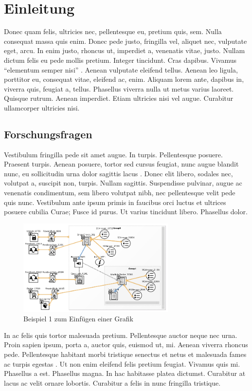 \chapter{Einleitung}
Donec quam felis, ultricies nec, pellentesque eu, pretium quis, sem. Nulla consequat massa quis enim. Donec pede justo, fringilla vel, aliquet nec, vulputate eget, arcu. In enim justo, rhoncus ut, imperdiet a, venenatis vitae, justo. Nullam dictum felis eu pede mollis pretium. Integer tincidunt. Cras dapibus. Vivamus "`elementum semper nisi"' \cite{Fischer.2010b}. Aenean vulputate eleifend tellus. Aenean leo ligula, porttitor eu, consequat vitae, eleifend ac, enim. Aliquam lorem ante, dapibus in, viverra quis, feugiat a, tellus. Phasellus viverra nulla ut metus varius laoreet. Quisque rutrum. Aenean imperdiet. Etiam ultricies nisi vel augue. Curabitur ullamcorper ultricies nisi. 


\section{Forschungsfragen}
Vestibulum fringilla pede sit amet augue. In turpis. Pellentesque posuere. Praesent turpis. Aenean posuere, tortor sed cursus feugiat, nunc augue blandit nunc, eu sollicitudin urna dolor sagittis lacus \cite[S. 33-39]{Brambilla.2012}. Donec elit libero, sodales nec, volutpat a, suscipit non, turpis. Nullam sagittis. Suspendisse pulvinar, augue ac venenatis condimentum, sem libero volutpat nibh, nec pellentesque velit pede quis nunc. Vestibulum ante ipsum primis in faucibus orci luctus et ultrices posuere cubilia Curae; Fusce id purus. Ut varius tincidunt libero. Phasellus dolor.  
\begin{figure}
	\centering
		\includegraphics[width=0.7\textwidth]{Bilder/emendo.png}
	\caption{Beispiel 1 zum Einfügen einer Grafik}
	\label{fig:bsp1}
\end{figure}

In ac felis quis tortor malesuada pretium. Pellentesque auctor neque nec urna. Proin sapien ipsum, porta a, auctor quis, euismod ut, mi. Aenean viverra rhoncus pede. Pellentesque habitant morbi tristique senectus et netus et malesuada fames ac turpis egestas \cite{LohrRichter.1993}. Ut non enim eleifend felis pretium feugiat. Vivamus quis mi. Phasellus a est. Phasellus magna. In hac habitasse platea dictumst. Curabitur at lacus ac velit ornare lobortis. Curabitur a felis in nunc fringilla tristique. 

